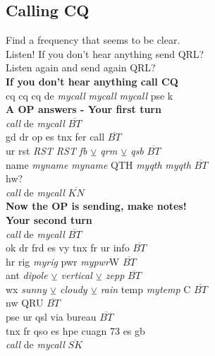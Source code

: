\documentclass[10pt]{article}
\begin{document}
\begin{multicols}{3}
\subsection{Calling CQ}
\vspace{\baselineskip}
Find a frequency that seems to be clear.\\
Listen! If you don't hear anything send QRL?\\ 
Listen again and send again QRL?\\
\textbf{If you don't hear anything call CQ}\\
cq cq cq de \textit{mycall} \textit{mycall} \textit{mycall} pse k\\ 
\textbf{A OP answers - Your first turn}\\
\textit{call} de \textit{mycall} $\overline{BT}$\\ gd dr op es tnx fer call $\overline{BT}$\\ ur rst \textit{RST} \textit{RST} \textit{fb $\veebar$ qrm $\veebar$ qsb} $\overline{BT}$\\ name \textit{myname} \textit{myname} QTH \textit{myqth} \textit{myqth} $\overline{BT}$\\ hw?\\ \textit{call} de \textit{mycall} $\overline{KN}$\\
\textbf{Now the OP is sending, make notes!}\\
\textbf{Your second turn}\\
\textit{call} de \textit{mycall} $\overline{BT}$\\ 
ok dr frd es vy tnx fr ur info $\overline{BT}$\\ 
hr rig \textit{myrig} pwr \textit{mypwr}W $\overline{BT}$\\
ant \textit{dipole $\veebar$ vertical $\veebar$ zepp} $\overline{BT}$\\
wx \textit{sunny $\veebar$ cloudy $\veebar$ rain} temp \textit{mytemp} C $\overline{BT}$\\
nw QRU $\overline{BT}$\\
pse ur qsl via bureau $\overline{BT}$\\
tnx fr qso es hpe cuagn 73 es gb\\
\textit{call} de \textit{mycall} $\overline{SK}$\\
\vspace{\baselineskip}

\end{multicols}
\end{document}
